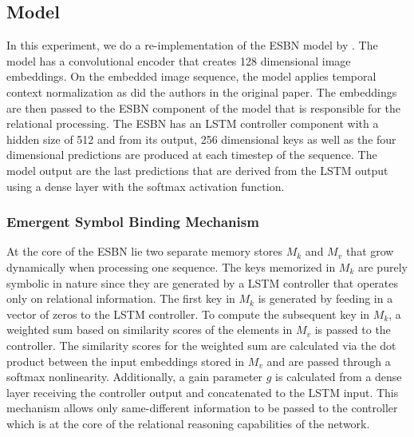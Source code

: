 \subsection{Model}
In this experiment, we do a re-implementation of the ESBN model by \textcite{webb_emergent_2021}. The model has a convolutional encoder that creates 128 dimensional image embeddings. On the embedded image sequence, the model applies temporal context normalization \textcite{webb_learning_2023} as did the authors in the original paper. The embeddings are then passed to the ESBN component of the model that is responsible for the relational processing. The ESBN has an LSTM controller component with a hidden size of 512 and from its output, 256 dimensional keys as well as the four dimensional predictions are produced at each timestep of the sequence. The model output are the last predictions that are derived from the LSTM output using a dense layer with the softmax activation function.

\subsubsection{Emergent Symbol Binding Mechanism}
At the core of the ESBN lie two separate memory stores \(M_k\) and \(M_v\) that grow dynamically when processing one sequence. The keys memorized in \(M_k\) are purely symbolic in nature since they are generated by a LSTM controller that operates only on relational information. The first key in \(M_k\) is generated by feeding in a vector of zeros to the LSTM controller. To compute the subsequent key in \(M_k\), a weighted sum based on similarity scores of the elements in \(M_v\) is passed to the controller. The similarity scores for the weighted sum are calculated via the dot product between the input embeddings stored in \(M_v\) and are passed through a softmax nonlinearity. Additionally, a gain parameter \(g\) is calculated from a dense layer receiving the controller output and concatenated to the LSTM input. This mechanism allows only same-different information to be passed to the controller which is at the core of the relational reasoning capabilities of the network.

